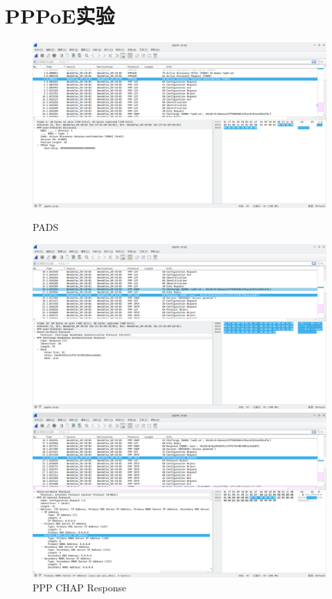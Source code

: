 \documentclass[a4paper]{article}
\begin{document}
\section{PPPoE实验}
\begin{figure}[H]
    \centering
    \begin{minipage}[t]{0.45\linewidth}
        \centering
        \includegraphics[width=\linewidth]{PPPoE-1.png}
        \caption{PADS}
        \label{1}
    \end{minipage}
    \begin{minipage}[t]{0.45\linewidth}
        \centering
        \includegraphics[width=\linewidth]{PPPoE-2.png}
        \caption{PPP CHAP Response}
        \label{2}
    \end{minipage}
    \begin{minipage}[t]{0.45\linewidth}
        \centering
        \includegraphics[width=\linewidth]{PPPoE-3.png}

\end{minipage}
\end{figure}
\end{document}
